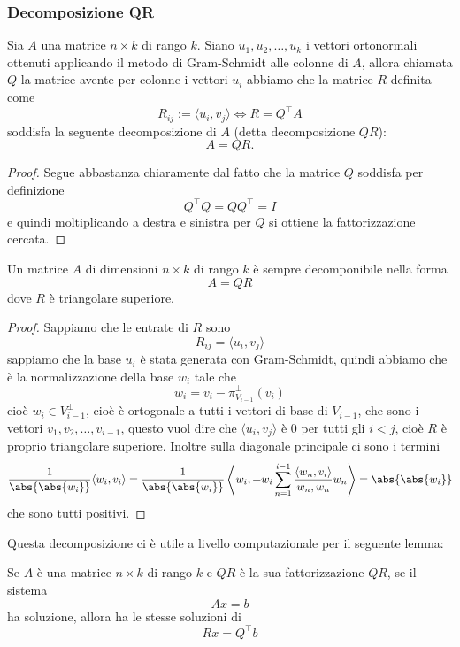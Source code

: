 \documentclass[11pt]{scrartcl}
\begin{document}
   	 \subsubsection{Decomposizione QR}
   	 \begin{proposition}[Decomposizione QR]
   	 	Sia $A$ una matrice $n\times k$ di rango $k$. Siano $u_1,u_2,\dots,u_k$ i vettori ortonormali ottenuti applicando il metodo di Gram-Schmidt alle colonne di $A$, allora chiamata $Q$ la matrice avente per colonne i vettori $u_i$ abbiamo che la matrice $R$ definita come
   	 	$$R_{ij}:=\langle u_i,v_j\rangle \iff R=Q^\intercal A $$
   	 	soddisfa la seguente decomposizione di $A$ (detta decomposizione $QR$):
   	 	$$A=QR.$$
   	 \end{proposition}
   	 \begin{proof}
   	 	Segue abbastanza chiaramente dal fatto che la matrice $Q$ soddisfa per definizione
   	 	$$Q^\intercal Q = QQ^\intercal = I$$
   	 	e quindi moltiplicando a destra e sinistra per $Q$ si ottiene la fattorizzazione cercata. 
   	 \end{proof}
   	 \begin{corollary}[$R$ è triangolare]
   	 	Un matrice $A$ di dimensioni $n\times k$ di rango $k$ è sempre decomponibile nella forma 
   	 	$$A=QR$$
   	 	dove $R$ è triangolare superiore.
   	 \end{corollary}
   	 \begin{proof}
   	 	Sappiamo che le entrate di $R$ sono 
   	 	$$R_{ij}=\langle u_i,v_j\rangle$$
   	 	sappiamo che la base $u_i$ è stata generata con Gram-Schmidt, quindi abbiamo che è la normalizzazione della base $w_i$ tale che
   	 	$$w_i=v_{i}-\pi_{V_{i-1}}^\perp(v_{i})$$
   	 	cioè $w_i\in V_{i-1}^\perp$, cioè è ortogonale a tutti i vettori di base di $V_{i-1}$, che sono i vettori $v_1,v_2,\dots,v_{i-1}$, questo vuol dire che $\langle u_i,v_j\rangle$ è $0$ per tutti gli $i<j$, cioè $R$ è proprio triangolare superiore. Inoltre sulla diagonale principale ci sono i termini 
   	 	$$\frac{1}{\abs{\abs{w_i}}}\langle w_i,v_i\rangle=\frac{1}{\abs{\abs{w_i}}}\left\langle w_i,+w_i\sum_{n=1}^{i-1}\frac{\langle w_n,v_i\rangle}{w_n,w_n}w_n\right\rangle=\abs{\abs{w_i}}$$
   	 	che sono tutti positivi.
   	 \end{proof}
   	 Questa decomposizione ci è utile a livello computazionale per il seguente lemma:
   	 \begin{lemma}
   	 	Se $A$ è una matrice $n\times k$ di rango $k$ e $QR$ è la sua fattorizzazione $QR$, se il sistema
   	 	$$Ax=b$$
   	 	ha soluzione, allora ha le stesse soluzioni di
   	 	$$Rx=Q^\intercal b$$
   	 \end{lemma}
\end{document}
